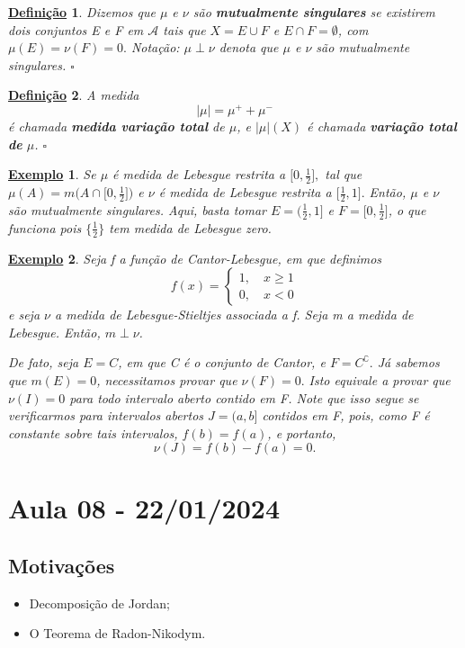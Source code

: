 \documentclass{article}
\newtheorem*{def*}{\underline{Defini\c c\~ao}}
\newtheorem{example}{\underline{Exemplo}}
\begin{document}
\begin{def*}
  Dizemos que \(\mu \) e \(\nu\) são \textbf{mutualmente singulares} se existirem dois conjuntos E e F em \(\mathcal{A}\) tais que \(X = E\cup F\) e \(E\cap F = \emptyset \), com \(\mu (E) = \nu(F) = 0.\) Notação: \(\mu \perp \nu\) denota que \(\mu \) e \(\nu\) são mutualmente singulares. \(\square\)
\end{def*}
\begin{def*}
  A medida 
    \[
      |\mu | = \mu ^{+} + \mu ^{-}
    \]
  é chamada \textbf{medida variação total} de \(\mu \), e \(|\mu |(X)\) é chamada \textbf{variação total de }\(\mu \). \(\square\)
\end{def*}
\begin{example}
  Se \(\mu \) é medida de Lebesgue restrita a \(\biggl[0, \frac{1}{2}\biggr],\) tal que \(\mu (A) = m \biggl(A \cap \biggl[0, \frac{1}{2}\biggr]\biggr) \) e \(\nu\) é medida de Lebesgue restrita a \(\biggl[\frac{1}{2}, 1\biggr].\) Então, \(\mu \) e \(\nu\) são mutualmente singulares. Aqui, basta tomar \(E = \biggl(\frac{1}{2}, 1\biggr]\) e \(F = \biggl[0, \frac{1}{2}\biggr]\), o que funciona pois 
  \(\biggl\{\frac{1}{2}\biggr\}\) tem medida de Lebesgue zero.
\end{example}
\begin{example}
  Seja f a função de Cantor-Lebesgue, em que definimos 
    \[
      f(x) = \left\{\begin{array}{ll}
          1,\quad x\geq 1 \\ 
          0,\quad x < 0
        \end{array}\right.
    \]
  e seja \(\nu\) a medida de Lebesgue-Stieltjes associada a f. Seja m a medida de Lebesgue. Então, \(m\perp \nu\).

  De fato, seja \(E = C\), em que C é o conjunto de Cantor, e \(F= C ^{\complement}.\) Já sabemos que \(m(E) = 0\), necessitamos provar que 
  \(\nu(F) = 0.\) Isto equivale a provar que \(\nu(I) = 0\) para todo intervalo aberto contido em F. Note que isso segue se verificarmos para intervalos abertos \(J = (a, b]\) contidos em F, pois, como 
F é constante sobre tais intervalos, \(f(b) = f(a)\), e portanto, 
  \[
    \nu(J) = f(b)-f(a) = 0.
  \]
\end{example}
\newpage

\newpage
\section{Aula 08 - 22/01/2024}
\subsection{Motivações}
\begin{itemize}
  \item Decomposição de Jordan;
  \item O Teorema de Radon-Nikodym.
\end{itemize}
\end{document}
